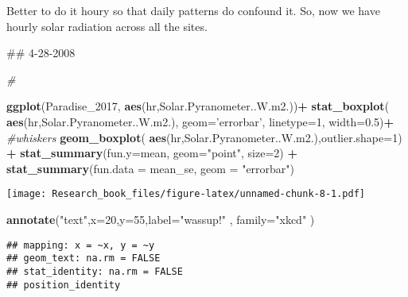 \documentclass[]{book}
\newenvironment{Shaded}{\begin{snugshade}}{\end{snugshade}}
\newcommand{\KeywordTok}[1]{\textcolor[rgb]{0.13,0.29,0.53}{\textbf{#1}}}
\newcommand{\DataTypeTok}[1]{\textcolor[rgb]{0.13,0.29,0.53}{#1}}
\newcommand{\DecValTok}[1]{\textcolor[rgb]{0.00,0.00,0.81}{#1}}
\newcommand{\FloatTok}[1]{\textcolor[rgb]{0.00,0.00,0.81}{#1}}
\newcommand{\StringTok}[1]{\textcolor[rgb]{0.31,0.60,0.02}{#1}}
\newcommand{\CommentTok}[1]{\textcolor[rgb]{0.56,0.35,0.01}{\textit{#1}}}
\newcommand{\OperatorTok}[1]{\textcolor[rgb]{0.81,0.36,0.00}{\textbf{#1}}}
\newcommand{\NormalTok}[1]{#1}
\theoremstyle{definition}
\theoremstyle{definition}
\theoremstyle{definition}
\theoremstyle{remark}
\begin{document}
Better to do it houry so that daily patterns do confound it. So, now we
have hourly solar radiation across all the sites.

\begin{Shaded}
\begin{Highlighting}[]
\NormalTok{## 4-28-2008}

\CommentTok{#}

\KeywordTok{ggplot}\NormalTok{(Paradise_}\DecValTok{2017}\NormalTok{, }\KeywordTok{aes}\NormalTok{(hr,Solar.Pyranometer..W.m2.))}\OperatorTok{+}
\StringTok{  }\KeywordTok{stat_boxplot}\NormalTok{( }\KeywordTok{aes}\NormalTok{(hr,Solar.Pyranometer..W.m2.), }
    \DataTypeTok{geom=}\StringTok{'errorbar'}\NormalTok{, }\DataTypeTok{linetype=}\DecValTok{1}\NormalTok{, }\DataTypeTok{width=}\FloatTok{0.5}\NormalTok{)}\OperatorTok{+}\StringTok{  }\CommentTok{#whiskers}
\StringTok{  }\KeywordTok{geom_boxplot}\NormalTok{( }\KeywordTok{aes}\NormalTok{(hr,Solar.Pyranometer..W.m2.),}\DataTypeTok{outlier.shape=}\DecValTok{1}\NormalTok{) }\OperatorTok{+}\StringTok{    }
\StringTok{  }\KeywordTok{stat_summary}\NormalTok{(}\DataTypeTok{fun.y=}\NormalTok{mean, }\DataTypeTok{geom=}\StringTok{"point"}\NormalTok{, }\DataTypeTok{size=}\DecValTok{2}\NormalTok{) }\OperatorTok{+}\StringTok{ }
\StringTok{  }\KeywordTok{stat_summary}\NormalTok{(}\DataTypeTok{fun.data =}\NormalTok{ mean_se, }\DataTypeTok{geom =} \StringTok{"errorbar"}\NormalTok{)}
\end{Highlighting}
\end{Shaded}

\texttt{[image: Research\_book\_files/figure-latex/unnamed-chunk-8-1.pdf]}

\begin{Shaded}
\begin{Highlighting}[]
 \KeywordTok{annotate}\NormalTok{(}\StringTok{"text"}\NormalTok{,}\DataTypeTok{x=}\DecValTok{20}\NormalTok{,}\DataTypeTok{y=}\DecValTok{55}\NormalTok{,}\DataTypeTok{label=}\StringTok{"wassup!"}\NormalTok{ , }\DataTypeTok{family=}\StringTok{"xkcd"}
\NormalTok{           )}
\end{Highlighting}
\end{Shaded}

\begin{verbatim}
## mapping: x = ~x, y = ~y 
## geom_text: na.rm = FALSE
## stat_identity: na.rm = FALSE
## position_identity
\end{verbatim}
\end{document}
